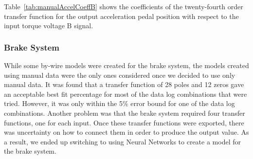 \documentclass[journal,twoside,web]{ieeecolor}
\begin{document}
\noindent Table~\ref{tab:manualAccelCoeffB} shows the coefficients of the twenty-fourth order transfer function for the output acceleration pedal position with respect to the input torque voltage B signal.%
%
\begin{table}[hbtp]
	\caption{Manual Mode Acceleration Transfer Function Torque Voltage B Coefficient Table}
	\label{tab:manualAccelCoeffB}
  \centering
    \begin{center}
    \end{center}	
\end{table}
%
\subsubsection{Brake System}
While some by-wire models were created for the brake system, the models created using manual data were the only ones considered once we decided to use only manual data. It was found that a transfer function of 28 poles and 12 zeros gave an acceptable best fit percentage for most of the data log combinations that were tried. However, it was only within the 5\% error bound for one of the data log combinations. Another problem was that the brake system required four transfer functions, one for each input. Once these transfer functions were exported, there was uncertainty on how to connect them in order to produce the output value. As a result, we ended up switching to using Neural Networks to create a model for the brake system. 
\end{document}
